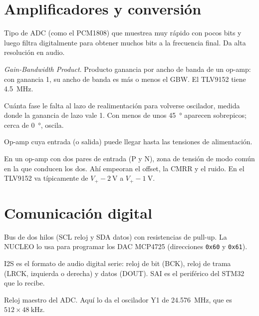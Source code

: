 \section*{Amplificadores y conversión}
\begin{description}[style=sameline,leftmargin=1.5em,labelindent=0pt]
  \item[Delta-sigma] Tipo de ADC (como el PCM1808) que muestrea muy rápido con pocos bits y luego filtra digitalmente
  para obtener muchos bits a la frecuencia final. Da alta resolución en audio.
  \item[GBW] \emph{Gain-Bandwidth Product}. Producto ganancia por ancho de banda de un op-amp: con ganancia 1, su ancho
  de banda es más o menos el GBW. El TLV9152 tiene \SI{4.5}{\mega\hertz}.
  \item[Margen de fase] Cuánta fase le falta al lazo de realimentación para volverse oscilador, medida donde la ganancia
  de lazo vale 1. Con menos de unos \SI{45}{\degree} aparecen sobrepicos; cerca de \SI{0}{\degree}, oscila.
  \item[Rail-to-rail] Op-amp cuya entrada (o salida) puede llegar hasta las tensiones de alimentación.
  \item[Región de transición] En un op-amp con dos pares de entrada (P y N), zona de tensión de modo común en la que
  conducen los dos. Ahí empeoran el offset, la CMRR y el ruido. En el TLV9152 va típicamente de $V_+ - \SI{2}{\volt}$
  a $V_+ - \SI{1}{\volt}$.
\end{description}

\section*{Comunicación digital}
\begin{description}[style=sameline,leftmargin=1.5em,labelindent=0pt]
  \item[I2C] Bus de dos hilos (SCL reloj y SDA datos) con resistencias de pull-up. La NUCLEO lo usa para programar los
  DAC MCP4725 (direcciones \texttt{0x60} y \texttt{0x61}).
  \item[I2S / SAI] I2S es el formato de audio digital serie: reloj de bit (BCK), reloj de trama (LRCK, izquierda o
  derecha) y datos (DOUT). SAI es el periférico del STM32 que lo recibe.
  \item[MCLK / SCKI] Reloj maestro del ADC. Aquí lo da el oscilador Y1 de \SI{24.576}{\mega\hertz}, que es
  $512 \times \SI{48}{\kilo\hertz}$.
\end{description}

